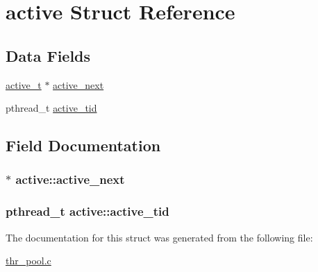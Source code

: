 \hypertarget{structactive}{
\section{active Struct Reference}
\label{structactive}
}
\subsection*{Data Fields}
\begin{DoxyCompactItemize}
\item 
\hyperlink{structactive}{active\_\-t} $\ast$ \hyperlink{structactive_a130ff71824c05181cb04db21bc9c6b8e}{active\_\-next}
\item 
pthread\_\-t \hyperlink{structactive_a4d86c9ab0bc7e9dc9d6429a8abd624dd}{active\_\-tid}
\end{DoxyCompactItemize}


\subsection{Field Documentation}
\hypertarget{structactive_a130ff71824c05181cb04db21bc9c6b8e}{
\subsubsection[{active\_\-next}]{$\ast$ {\bf active::active\_\-next}}}
\label{structactive_a130ff71824c05181cb04db21bc9c6b8e}
\hypertarget{structactive_a4d86c9ab0bc7e9dc9d6429a8abd624dd}{
\subsubsection[{active\_\-tid}]{\setlength{\rightskip}{0pt plus 5cm}pthread\_\-t {\bf active::active\_\-tid}}}
\label{structactive_a4d86c9ab0bc7e9dc9d6429a8abd624dd}


The documentation for this struct was generated from the following file:\begin{DoxyCompactItemize}
\item 
\hyperlink{thr__pool_8c}{thr\_\-pool.c}\end{DoxyCompactItemize}
